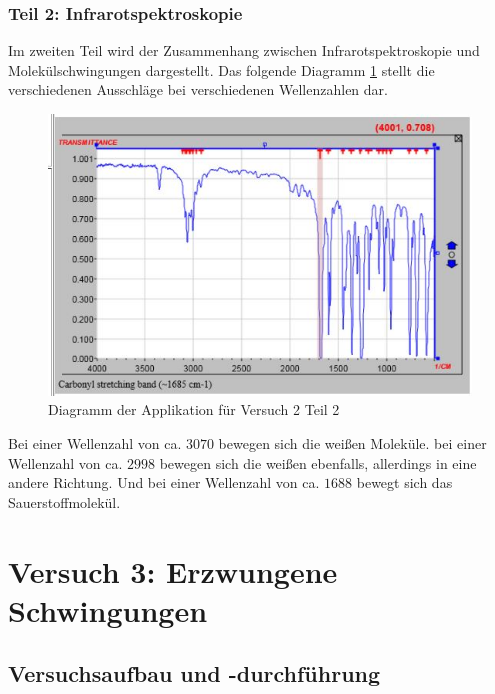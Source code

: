         \subsubsection{Teil 2: Infrarotspektroskopie}
        
            Im zweiten Teil wird der Zusammenhang zwischen Infrarotspektroskopie und Molekülschwingungen dargestellt. Das folgende Diagramm \ref{fig:diagram_v2} stellt die verschiedenen Ausschläge bei verschiedenen Wellenzahlen dar.

            \begin{figure}[H]
                \centering
                \includegraphics[width=\textwidth]{bilder/diagram_v2.jpg}
                \caption{Diagramm der Applikation für Versuch 2 Teil 2}
                \label{fig:diagram_v2}
            \end{figure}

            Bei einer Wellenzahl von ca. $3070$ bewegen sich die weißen Moleküle. bei einer Wellenzahl von ca. $2998$ bewegen sich die weißen ebenfalls, allerdings in eine andere Richtung. Und bei einer Wellenzahl von ca. $1688$ bewegt sich das Sauerstoffmolekül.

\newpage

\section{Versuch 3: Erzwungene Schwingungen}

    \subsection{Versuchsaufbau und -durchführung}
            
